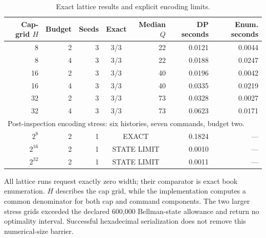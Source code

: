 \begin{table}[p]\centering\small
\caption{Exact lattice results and explicit encoding limits.}\label{tab:lattice56}
\begin{tabular}{@{}rrrcrrr@{}}\toprule
Cap-grid $H$ & Budget & Seeds & Exact & Median $Q$ & DP seconds & Enum. seconds \\ \midrule
8 & 2 & 3 & 3/3 & 22 & 0.0121 & 0.0044 \\
8 & 4 & 3 & 3/3 & 22 & 0.0188 & 0.0247 \\
16 & 2 & 3 & 3/3 & 40 & 0.0196 & 0.0042 \\
16 & 4 & 3 & 3/3 & 40 & 0.0335 & 0.0219 \\
32 & 2 & 3 & 3/3 & 73 & 0.0328 & 0.0027 \\
32 & 4 & 3 & 3/3 & 73 & 0.0623 & 0.0171 \\
\midrule \multicolumn{7}{l}{Post-inspection encoding stress: six histories, seven commands, budget two.} \\
$2^{8}$ & 2 & 1 & \multicolumn{2}{c}{EXACT} & 0.1824 & --- \\
$2^{16}$ & 2 & 1 & \multicolumn{2}{c}{STATE LIMIT} & 0.0010 & --- \\
$2^{32}$ & 2 & 1 & \multicolumn{2}{c}{STATE LIMIT} & 0.0011 & --- \\
\bottomrule\end{tabular}
\par\smallskip\begin{minipage}{\textwidth}\footnotesize All lattice runs request exactly zero width; their comparator is exact book enumeration. $H$ describes the cap grid, while the implementation computes a common denominator for both cap and command components. The two larger stress grids exceeded the declared 600,000 Bellman-state allowance and return no optimality interval. Successful hexadecimal serialization does not remove this numerical-size barrier.\end{minipage}
\end{table}\clearpage
